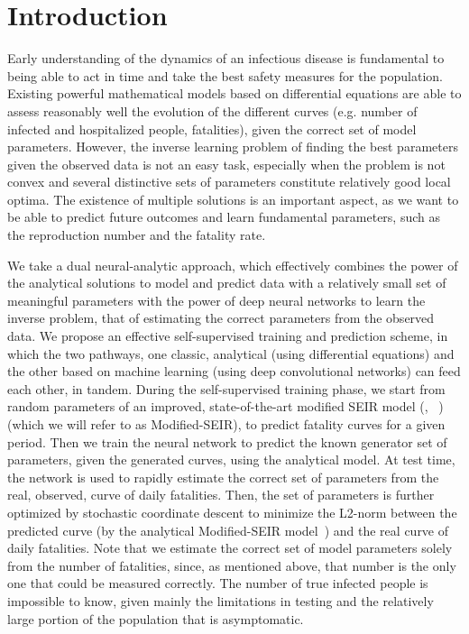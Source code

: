 \documentclass[11pt]{article}
\begin{document}
\section{Introduction}

Early understanding of the dynamics of an infectious disease is fundamental to being able to act in time and take the best safety measures for the population. Existing powerful mathematical models based on differential equations are able to assess reasonably well the evolution of the different curves (e.g. number of infected and hospitalized people, fatalities), given the correct set of model parameters. However, the inverse learning problem of finding the best parameters given the observed data is not an easy task, especially when the problem is not convex and several distinctive sets of parameters constitute relatively good local optima. The existence of multiple solutions is an important aspect, as we want to be able to predict future outcomes and learn fundamental parameters, such as the reproduction number and the fatality rate.

We take a dual neural-analytic approach, which effectively combines the power of the analytical solutions to model and predict data with a relatively small set of meaningful parameters with the power of deep neural networks to learn the inverse problem, that of estimating the correct parameters from the observed data. We propose an effective self-supervised training and prediction scheme, in which the two pathways, one classic, analytical (using differential equations) and the other based on machine learning (using deep convolutional networks) can feed each other, in tandem. During the self-supervised training phase, we start from random parameters of an improved, state-of-the-art modified SEIR model (\cite{chowdhury2020dynamic}, ~\cite{gabgoh}) (which we will refer to as Modified-SEIR), to predict fatality curves for a given period. Then we train the neural network to predict the known generator set of parameters, given the generated curves, using the analytical model. At test time, the network is used to rapidly estimate the correct set of parameters from the real, observed, curve of daily fatalities. Then, the set of parameters is further optimized by stochastic coordinate descent to minimize the L2-norm between the predicted curve (by the analytical Modified-SEIR model~\cite{chowdhury2020dynamic}) and the real curve of daily fatalities.  Note that we estimate the correct set of model parameters solely from the number of fatalities, since, as mentioned above, that number is the only one that could be measured correctly. The number of true infected people is impossible to know, given mainly the limitations in testing and the relatively large portion of the population that is asymptomatic.
\end{document}
